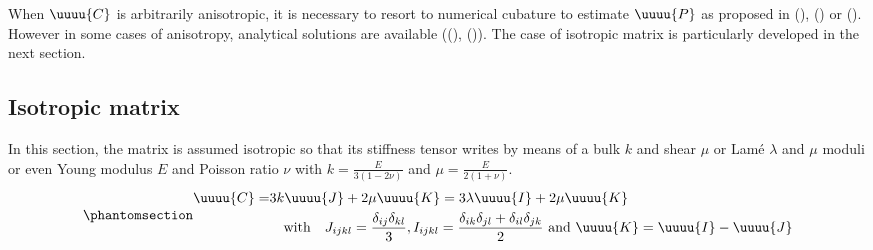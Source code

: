 \documentclass[
  letterpaper,
  DIV=11,
  numbers=noendperiod]{scrreprt}
\begin{document}
When \(\uuuu{C}\) is arbitrarily anisotropic, it is necessary to resort
to numerical cubature to estimate \(\uuuu{P}\) as proposed in
(),
() or
(). However in some cases of
anisotropy, analytical solutions are available
((),
()). The
case of isotropic matrix is particularly developed in the next section.

\subsection{Isotropic matrix}\label{isotropic-matrix}

In this section, the matrix is assumed isotropic so that its stiffness
tensor writes by means of a bulk \(k\) and shear \(\mu\) or Lamé
\(\lambda\) and \(\mu\) moduli or even Young modulus \(E\) and Poisson
ratio \(\nu\) with \(k=\frac{E}{3(1-2\nu)}\) and
\(\mu=\frac{E}{2(1+\nu)}\).
\begin{equation}\phantomsection\label{eq-isoC}{\begin{aligned}
\uuuu{C} =& {} 3k\uuuu{J}+2\mu\uuuu{K} =  3\lambda\uuuu{I}+2\mu\uuuu{K}\\
 & \quad\textrm{with}\quad J_{ijkl}=\frac{\delta_{ij}\delta_{kl}}{3},
I_{ijkl}=\frac{\delta_{ik}\delta_{jl}+\delta_{il}\delta_{jk}}{2}
\textrm{ and }
\uuuu{K}=\uuuu{I}-\uuuu{J}
\end{aligned}}\end{equation}
\end{document}
